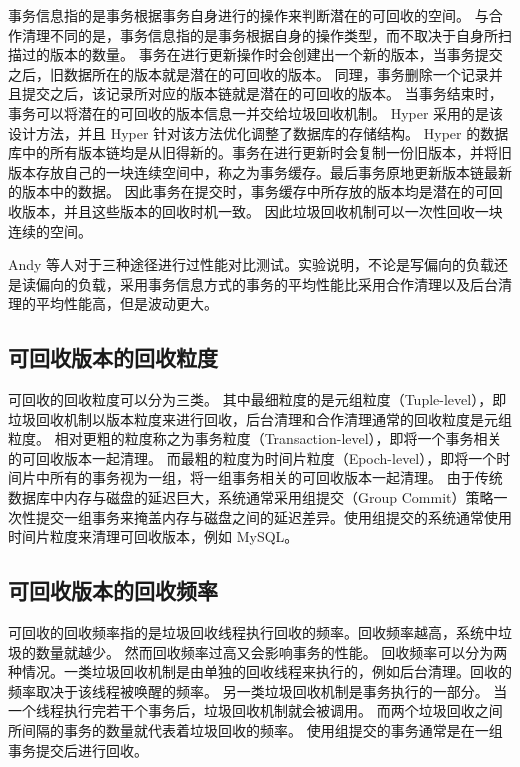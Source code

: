 事务信息指的是事务根据事务自身进行的操作来判断潜在的可回收的空间。
与合作清理不同的是，事务信息指的是事务根据自身的操作类型，而不取决于自身所扫描过的版本的数量。
事务在进行更新操作时会创建出一个新的版本，当事务提交之后，旧数据所在的版本就是潜在的可回收的版本。
同理，事务删除一个记录并且提交之后，该记录所对应的版本链就是潜在的可回收的版本。
当事务结束时，事务可以将潜在的可回收的版本信息一并交给垃圾回收机制。
Hyper\cite{hyper} 采用的是该设计方法，并且 Hyper 针对该方法优化调整了数据库的存储结构。
Hyper 的数据库中的所有版本链均是从旧得新的。事务在进行更新时会复制一份旧版本，并将旧版本存放自己的一块连续空间中，称之为事务缓存。最后事务原地更新版本链最新的版本中的数据。
因此事务在提交时，事务缓存中所存放的版本均是潜在的可回收版本，并且这些版本的回收时机一致。
因此垃圾回收机制可以一次性回收一块连续的空间。

Andy 等人对于三种途径进行过性能对比测试\cite{mvcc_evaluation}。实验说明，不论是写偏向的负载还是读偏向的负载，采用事务信息方式的事务的平均性能比采用合作清理以及后台清理的平均性能高，但是波动更大。


\subsection{可回收版本的回收粒度}

可回收的回收粒度可以分为三类。
其中最细粒度的是元组粒度（Tuple-level），即垃圾回收机制以版本粒度来进行回收，后台清理和合作清理通常的回收粒度是元组粒度。
相对更粗的粒度称之为事务粒度（Transaction-level），即将一个事务相关的可回收版本一起清理。
而最粗的粒度为时间片粒度（Epoch-level），即将一个时间片中所有的事务视为一组，将一组事务相关的可回收版本一起清理。
由于传统数据库中内存与磁盘的延迟巨大，系统通常采用组提交（Group Commit）策略一次性提交一组事务来掩盖内存与磁盘之间的延迟差异。使用组提交的系统通常使用时间片粒度来清理可回收版本，例如 MySQL。

\subsection{可回收版本的回收频率}

可回收的回收频率指的是垃圾回收线程执行回收的频率。回收频率越高，系统中垃圾的数量就越少。
然而回收频率过高又会影响事务的性能。
回收频率可以分为两种情况。一类垃圾回收机制是由单独的回收线程来执行的，例如后台清理。回收的频率取决于该线程被唤醒的频率。
另一类垃圾回收机制是事务执行的一部分。
当一个线程执行完若干个事务后，垃圾回收机制就会被调用。
而两个垃圾回收之间所间隔的事务的数量就代表着垃圾回收的频率。
使用组提交的事务通常是在一组事务提交后进行回收。

